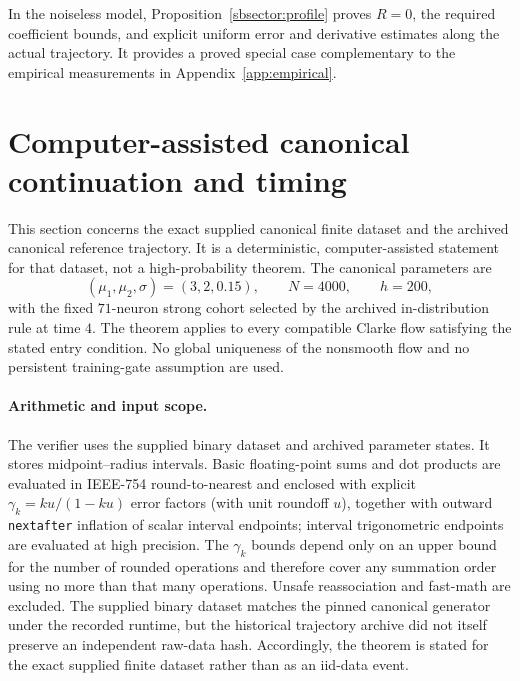 \documentclass[10pt]{article}
\theoremstyle{remark}\newtheorem{remark}[theorem]{Remark}
\begin{document}
In the noiseless model, Proposition~\ref{sbsector:profile} proves
$R=0$, the required coefficient bounds, and explicit uniform error and
derivative estimates along the actual trajectory. It provides a proved
special case complementary to the empirical measurements in
Appendix~\ref{app:empirical}.



\section{Computer-assisted canonical continuation and timing}
\label{app:canonical-cert}

This section concerns the exact supplied canonical finite dataset and the
archived canonical reference trajectory. It is a deterministic,
computer-assisted statement for that dataset, not a high-probability theorem.
The canonical parameters are
\[
 (\mu_1,\mu_2,\sigma)=(3,2,0.15),\qquad N=4000,\qquad h=200,
\]
with the fixed $71$-neuron strong cohort selected by the archived
in-distribution rule at time $4$. The theorem applies to every compatible
Clarke flow satisfying the stated entry condition. No global uniqueness of
the nonsmooth flow and no persistent training-gate assumption are used.

\paragraph{Arithmetic and input scope.}
The verifier uses the supplied binary dataset and archived parameter states.
It stores midpoint--radius intervals. Basic floating-point sums and dot
products are evaluated in IEEE-754 round-to-nearest and enclosed with explicit
$\gamma_k=ku/(1-ku)$ error factors (with unit roundoff $u$), together with
outward \texttt{nextafter} inflation of scalar interval endpoints; interval
trigonometric endpoints are evaluated at high precision. The $\gamma_k$
bounds depend only on an upper bound for the number of rounded operations and
therefore cover any summation order using no more than that many operations.
Unsafe reassociation and fast-math are excluded. The supplied binary dataset
matches the pinned canonical generator under the recorded runtime, but the
historical trajectory archive did not itself preserve an independent raw-data
hash. Accordingly, the theorem is stated for the exact supplied finite
dataset rather than as an iid-data event.
\end{document}
